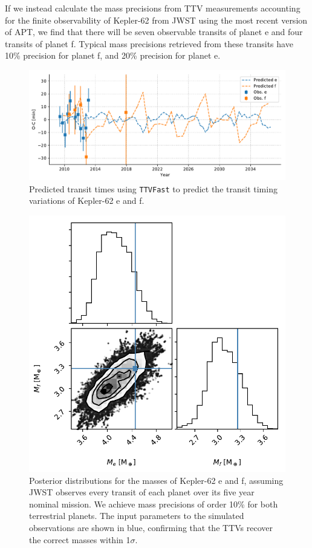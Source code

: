 If we instead calculate the mass precisions from TTV measurements accounting for the finite observability of Kepler-62 from JWST using the most recent version of APT, we find that there will be seven observable transits of planet e and four transits of planet f. Typical mass precisions retrieved from these transits have 10\% precision for planet f, and 20\% precision for planet e.  

\begin{figure}
    \centering
    \includegraphics[width=\textwidth]{libra/ttvs_predicted.pdf}
    \caption{Predicted transit times using \texttt{TTVFast} to predict the transit timing variations of Kepler-62 e and f. }
    \label{fig:ttv_predicted}
\end{figure}

\begin{figure}
    \centering
    \includegraphics[scale=0.6]{libra/masses_kitchen_sink.pdf}
    \caption{Posterior distributions for the masses of Kepler-62 e and f, assuming JWST observes every transit of each planet over its five year nominal mission. We achieve mass precisions of order 10\% for both terrestrial planets. The input parameters to the simulated observations are shown in blue, confirming that the TTVs recover the correct masses within 1$\sigma$.}
    \label{fig:mass_posteriors}
\end{figure}


